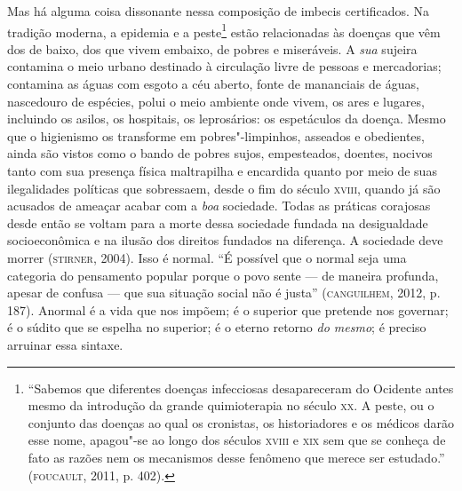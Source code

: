 Mas há alguma coisa dissonante nessa composição de imbecis certificados.
Na tradição moderna, a epidemia e a peste\footnote{``Sabemos que
  diferentes doenças infecciosas desapareceram do Ocidente antes mesmo
  da introdução da grande quimioterapia no século \textsc{xx}. A peste, ou o
  conjunto das doenças ao qual os cronistas, os historiadores e os
  médicos darão esse nome, apagou"-se ao longo dos séculos \textsc{xviii} e \textsc{xix}
  sem que se conheça de fato as razões nem os mecanismos desse fenômeno
  que merece ser estudado.'' (\textsc{foucault}, 2011, p. 402).} estão
relacionadas às doenças que vêm dos de baixo, dos que vivem embaixo, de
pobres e miseráveis. A \emph{sua} sujeira contamina o meio urbano
destinado à circulação livre de pessoas e mercadorias; contamina as
águas com esgoto a céu aberto, fonte de mananciais de águas, nascedouro
de espécies, polui o meio ambiente onde vivem, os ares e lugares,
incluindo os asilos, os hospitais, os leprosários: os espetáculos da
doença. Mesmo que o higienismo os transforme em pobres"-limpinhos,
asseados e obedientes, ainda são vistos como o bando de pobres sujos,
empesteados, doentes, nocivos tanto com sua presença física maltrapilha
e encardida quanto por meio de suas ilegalidades políticas que
sobressaem, desde o fim do século \textsc{xviii}, quando já são acusados de
ameaçar acabar com a \emph{boa} sociedade. Todas as práticas corajosas
desde então se voltam para a morte dessa sociedade fundada na
desigualdade socioeconômica e na ilusão dos direitos fundados na
diferença. A sociedade deve morrer (\textsc{stirner}, 2004). Isso é normal. ``É
possível que o normal seja uma categoria do pensamento popular porque o
povo sente --- de maneira profunda, apesar de confusa --- que sua
situação social não é justa'' (\textsc{canguilhem}, 2012, p. 187). Anormal é a
vida que nos impõem; é o superior que pretende nos governar; é o súdito
que se espelha no superior; é o eterno retorno \emph{do mesmo}; é
preciso arruinar essa sintaxe.

